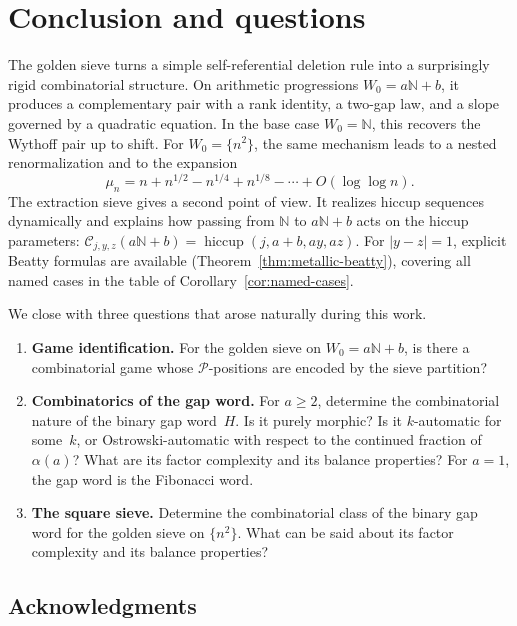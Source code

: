 \documentclass[11pt]{article}
\numberwithin{equation}{section}
\theoremstyle{plain}
\theoremstyle{definition}
\theoremstyle{remark}
\newcommand{\N}{\mathbb{N}}
\begin{document}
\section{Conclusion and questions}\label{sec:concl}

The golden sieve turns a simple self-referential deletion rule into a
surprisingly rigid combinatorial structure.  On arithmetic progressions
$W_0=a\N+b$, it produces a complementary pair with a rank identity,
a two-gap law, and a slope governed by a quadratic equation.  In the
base case $W_0=\N$, this recovers the Wythoff pair up to shift.
For $W_0=\{n^2\}$, the same mechanism leads to a nested renormalization
and to the expansion
\[
  \mu_n=n+n^{1/2}-n^{1/4}+n^{1/8}-\cdots+O(\log\log n).
\]
The extraction sieve gives a second point of view.  It realizes hiccup
sequences dynamically and explains how passing from $\N$ to $a\N+b$
acts on the hiccup parameters: $\mathcal{C}_{j,y,z}(a\N+b)=\operatorname{hiccup}(j,a{+}b,ay,az)$.
For $|y-z|=1$, explicit Beatty formulas are available
(Theorem~\ref{thm:metallic-beatty}), covering all named cases in the table
of Corollary~\ref{cor:named-cases}.

\medskip

We close with three questions that arose naturally during this work.

\begin{enumerate}
\item \textbf{Game identification.}
  For the golden sieve on $W_0=a\N+b$, is there a
  combinatorial game whose $\mathcal{P}$-positions are encoded by the sieve partition?

\item \textbf{Combinatorics of the gap word.}
  For $a\ge2$, determine the combinatorial nature of the binary gap
  word~$H$.  Is it purely morphic?  Is it $k$-automatic for some~$k$,
  or Ostrowski-automatic with respect to the continued fraction of
  $\alpha(a)$?  What are its factor complexity and its balance properties?
  For $a=1$, the gap word is the Fibonacci word.

\item \textbf{The square sieve.}
  Determine the combinatorial class of the binary gap word for the
  golden sieve on $\{n^2\}$.  What can be said about its factor
  complexity and its balance properties?
\end{enumerate}

\subsection*{Acknowledgments}
\end{document}
